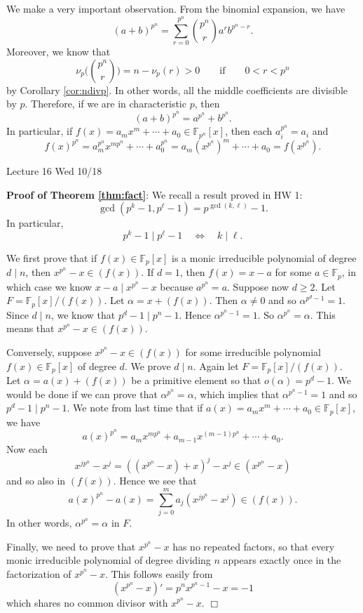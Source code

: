 \documentclass{article}
\def\F{{\mathbb F}}
\def\F{{\mathbb F}}
\newcommand{\add}[1]{{\color{blue} #1}}
\begin{document}
We make a very important observation. From the binomial expansion, we have
$$(a + b)^{p^n} = \sum_{r = 0}^{p^n}\binom{p^n}{r}a^rb^{p^n - r}.$$
Moreover, we know that $$\nu_p\Big(\binom{p^n}{r}\Big) = n - \nu_p(r) > 0 \qquad\mbox{if}\qquad 0 < r < p^n$$ by Corollary \ref{cor:ndivp}. In other words, all the middle coefficients are divisible by $p$. Therefore, if we are in characteristic $p$, then
$$(a + b)^{p^n} = a^{p^n} + b^{p^n}.$$
In particular, if $f(x) = a_mx^m + \cdots + a_0 \in \F_{p^n}[x]$, then each $a_i^{p^n} = a_i$ and
$$f(x)^{p^n} = a_m^{p^n}x^{mp^n} + \cdots + a_0^{p^n} = a_m(x^{p^n})^m + \cdots + a_0 = f(x^{p^n}).$$

\begin{center}
    \add{Lecture 16 Wed 10/18}
\end{center}

\noindent\textbf{Proof of Theorem \ref{thm:fact}}: We recall a result proved in HW 1:
$$\gcd(p^k - 1, p^\ell - 1) = p^{\gcd(k,\ell)} - 1.$$
In particular, $$p^k - 1\mid p^\ell - 1\quad\Longleftrightarrow\quad k\mid\ell.$$

We first prove that if $f(x)\in\F_p[x]$ is a monic irreducible polynomial of degree $d\mid n$, then $x^{p^n} - x \in (f(x))$. If $d = 1$, then $f(x) = x - a$ for some $a\in\F_p$, in which case we know $x-a\mid x^{p^n}-x$ because $a^{p^n} = a$. Suppose now $d\geq 2$. Let $F = \F_p[x]/(f(x))$. Let $\alpha = x + (f(x))$. Then $\alpha\neq 0$ and so $\alpha^{p^d-1} = 1$. Since $d\mid n$, we know that $p^d - 1 \mid p^n - 1$. Hence $\alpha^{p^n - 1} = 1$. So $\alpha^{p^n} = \alpha$. This means that $x^{p^n} - x \in (f(x))$. 

Conversely, suppose $x^{p^n} - x\in(f(x))$ for some irreducible polynomial $f(x)\in\F_p[x]$ of degree $d$. We prove $d\mid n$. Again let $F = \F_p[x]/(f(x))$. Let $\alpha = a(x) + (f(x))$ be a primitive element so that $o(\alpha) = p^d - 1$. We would be done if we can prove that $\alpha^{p^n} = \alpha$, which implies that $\alpha^{p^n-1}=1$ and so $p^d - 1\mid p^n - 1$. We note from last time that if $a(x)=a_mx^m + \cdots + a_0\in \F_p[x]$, we have $$a(x)^{p^n} = a_mx^{mp^n} + a_{m-1}x^{(m-1)p^n} + \cdots + a_0.$$
Now each $$x^{jp^n} - x^j = ((x^{p^n} - x) + x)^j - x^j \in (x^{p^n} - x)$$ and so also in $(f(x))$. Hence we see that $$a(x)^{p^n} - a(x) = \sum_{j=0}^m a_j(x^{jp^n} - x^j) \in (f(x)).$$ In other words, $\alpha^{p^n} = \alpha$ in $F$.

Finally, we need to prove that $x^{p^n} - x$ has no repeated factors, so that every monic irreducible polynomial of degree dividing $n$ appears exactly once in the factorization of $x^{p^n} - x$. This follows easily from $$(x^{p^n} - x)' = p^nx^{p^n - 1} - x = -1$$
which shares no common divisor with $x^{p^n} - x$. $\Box$
\end{document}

